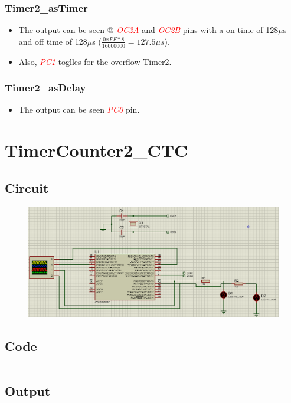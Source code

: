 \documentclass[oneside]{book}
\newcommand{\pinFormat}[1]{\emph{\textcolor{red}{#1}}}
\begin{document}
\subsubsection{Timer2\_asTimer}
\begin{itemize}
    \item The output can be seen @ \pinFormat{OC2A} and \pinFormat{OC2B} pins with a on time of 128$\mu$s and off time of 128$\mu$s ($\frac{0xFF * 8}{16000000} = 127.5\mu s$).
    \item Also, \pinFormat{PC1} toglles for the overflow Timer2.
\end{itemize}
\subsubsection{Timer2\_asDelay}
\begin{itemize}
    \item The output can be seen \pinFormat{PC0} pin.
\end{itemize}


\section{TimerCounter2\_CTC}
\subsection{Circuit}
\begin{figure}[H]
    \centering
    \includegraphics[height=0.2\textheight]{TimerCounter2_CTC.png}
\end{figure}
\subsection{Code}
\inputminted[breaklines, bgcolor=black]{c}{./programFiles/TimerCounter2_CTC.c}
\subsection{Output}
\end{document}
